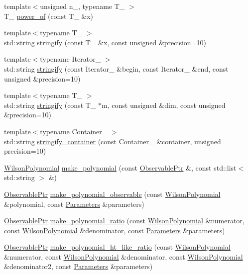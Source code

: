 \begin{DoxyCompactItemize}
\item 
{\footnotesize template$<$unsigned n\_\-, typename T\_\- $>$ }\\T\_\- \hyperlink{namespaceeos_a89d53e5e358a7428b14c811668193e3f}{power\_\-of} (const T\_\- \&x)
\item 
{\footnotesize template$<$typename T\_\- $>$ }\\std::string \hyperlink{namespaceeos_a4d4fd832aebc28739c76d8cbd3dda6df}{stringify} (const T\_\- \&x, const unsigned \&precision=10)
\item 
{\footnotesize template$<$typename Iterator\_\- $>$ }\\std::string \hyperlink{namespaceeos_ab40b1d4ac1085fb65c4ca86d05079c5c}{stringify} (const Iterator\_\- \&begin, const Iterator\_\- \&end, const unsigned \&precision=10)
\item 
{\footnotesize template$<$typename T\_\- $>$ }\\std::string \hyperlink{namespaceeos_a03d43be369d3c0247d25fedbb6eeb8e9}{stringify} (const T\_\- $\ast$m, const unsigned \&dim, const unsigned \&precision=10)
\item 
{\footnotesize template$<$typename Container\_\- $>$ }\\std::string \hyperlink{namespaceeos_ae90d5cf81cb527f4088dd11daf1e456d}{stringify\_\-container} (const Container\_\- \&container, unsigned precision=10)
\item 
\hyperlink{classeos_1_1OneOf}{WilsonPolynomial} \hyperlink{namespaceeos_ae661f13ba6f529e7a5c19865f6528da6}{make\_\-polynomial} (const \hyperlink{namespaceeos_a470e5dd806bd129080f1aa0c2954646f}{ObservablePtr} \&, const std::list$<$ std::string $>$ \&)
\item 
\hyperlink{namespaceeos_a470e5dd806bd129080f1aa0c2954646f}{ObservablePtr} \hyperlink{namespaceeos_a702bfbd9d3f9e42e94628616b8760853}{make\_\-polynomial\_\-observable} (const \hyperlink{classeos_1_1OneOf}{WilsonPolynomial} \&polynomial, const \hyperlink{classeos_1_1Parameters}{Parameters} \&parameters)
\item 
\hyperlink{namespaceeos_a470e5dd806bd129080f1aa0c2954646f}{ObservablePtr} \hyperlink{namespaceeos_aeb8e7723a15217742675f8f16ebbc4f9}{make\_\-polynomial\_\-ratio} (const \hyperlink{classeos_1_1OneOf}{WilsonPolynomial} \&numerator, const \hyperlink{classeos_1_1OneOf}{WilsonPolynomial} \&denominator, const \hyperlink{classeos_1_1Parameters}{Parameters} \&parameters)
\item 
\hyperlink{namespaceeos_a470e5dd806bd129080f1aa0c2954646f}{ObservablePtr} \hyperlink{namespaceeos_a25bb05f44e3b5f6b6c5197277e22776b}{make\_\-polynomial\_\-ht\_\-like\_\-ratio} (const \hyperlink{classeos_1_1OneOf}{WilsonPolynomial} \&numerator, const \hyperlink{classeos_1_1OneOf}{WilsonPolynomial} \&denominator, const \hyperlink{classeos_1_1OneOf}{WilsonPolynomial} \&denominator2, const \hyperlink{classeos_1_1Parameters}{Parameters} \&parameters)

\end{DoxyCompactItemize}
